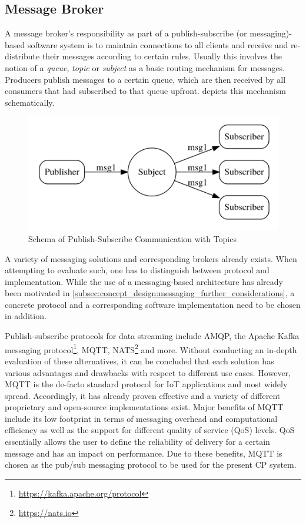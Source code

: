\subsection{Message Broker}
\label{subsec:implementation:message_broker}
A message broker's responsibility as part of a publish-subscribe (or messaging)-based software system is to maintain connections to all clients and receive and re-distribute their messages according to certain rules. Usually this involves the notion of a \textit{queue}, \textit{topic} or \textit{subject} as a basic routing mechanism for messages. Producers publish messages to a certain queue, which are then received by all consumers that had subscribed to that queue upfront.  depicts this mechanism schematically. 

\begin{figure}
	\centering
	\includegraphics[width=0.65\linewidth]{98_images/pubsub}
	\caption[Schema of Publish-Subscribe Communication with Topics]{Schema of Publish-Subscribe Communication with Topics \cite{Collison2019}}
	\label{fig:pubsub_topics}
\end{figure}


A variety of messaging solutions and corresponding brokers already exists. When attempting to evaluate such, one has to distinguish between protocol and implementation. While the use of a messaging-based architecture has already been motivated in \cref{subsec:concept_design:messaging_further_considerations}, a concrete protocol and a corresponding software implementation need to be chosen in addition. 

Publish-subscribe protocols for data streaming include AMQP, the Apache Kafka messaging protocol\footnote{\url{https://kafka.apache.org/protocol}}, MQTT, NATS\footnote{\url{https://nats.io}} and more. Without conducting an in-depth evaluation of these alternatives, it can be concluded that each solution has various advantages and drawbacks with respect to different use cases. However, MQTT is the de-facto standard protocol for IoT applications and most widely spread. Accordingly, it has already proven effective and a variety of different proprietary and open-source implementations exist. Major benefits of MQTT include its low footprint in terms of messaging overhead and computational efficiency as well as the support for different quality of service (QoS) levels. QoS essentially allows the user to define the reliability of delivery for a certain message and has an impact on performance. Due to these benefits, MQTT is chosen as the pub/sub messaging protocol to be used for the present CP system. 

